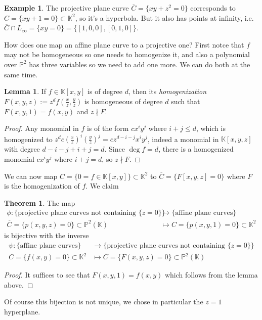 \documentclass{article}
\newcommand{\K}{\mathbb{K}}
\newcommand{\p}{\mathbb{P}}
\theoremstyle{definition}
\newtheorem{thm}[defn]{Theorem}
\newtheorem{lemma}[defn]{Lemma}
\newtheorem{example}[defn]{Example}
\begin{document}
\begin{example}
The projective plane curve $\overline C=\{xy+z^2=0\}$ corresponds to $C=\{xy+1=0\}\subset\K^2$, so it's a hyperbola. But it also has points at infinity, i.e. $\overline C\cap L_\infty=\{xy=0\}=\{[1,0,0],[0,1,0]\}$.
\end{example}

How does one map an affine plane curve to a projective one? First notce that $f$ may not be homogeneous so one needs to homogenize it, and also a polynomial over $\p^2$ has three variables so we need to add one more. We can do both at the same time.

\begin{lemma}
If $f\in\K[x,y]$ is of degree $d$, then its \textit{homogenization} $F(x,y,z):=z^d f\left(\frac{x}{z},\frac{y}{z}\right)$ is homogeneous of degree $d$ such that $F(x,y,1)=f(x,y)$ and $z\nmid F$.
\end{lemma}
\begin{proof}
Any monomial in $f$ is of the form $cx^iy^j$ where $i+j\leq d$, which is homogenized to $z^d c\left(\frac{x}{z}\right)^i\left(\frac{y}{z}\right)^j=cz^{d-i-j}x^iy^j$, indeed a monomial in $\K[x,y,z]$ with degree $d-i-j+i+j=d$. Since $\deg f=d$, there is a homogenized monomial $cx^iy^j$ where $i+j=d$, so $z\nmid F$.
\end{proof}

We can now map $C=\{0=f\in\K[x,y]\}\subset\K^2$ to $\overline C=\{F[x,y,z]=0\}$ where $F$ is the homogenization of $f$. We claim
\begin{thm}
The map
\[
\begin{aligned}
\phi:\{\text{projective plane curves not containing }\{z=0\}\}&\rightarrow\{\text{affine plane curves}\} \\
\overline C=\{p(x,y,z)=0\}\subset\p^2(\K)&\mapsto C=\{p(x,y,1)=0\}\subset\K^2
\end{aligned}
\]
is bijective with the inverse
\[
\begin{aligned}
\psi:\{\text{affine plane curves}\}&\rightarrow\{\text{projective plane curves not containing }\{z=0\}\} \\
C=\{f(x,y)=0\}\subset\K^2&\mapsto\overline C=\{F(x,y,z)=0\}\subset\p^2(\K)
\end{aligned}
\]
\end{thm}
\begin{proof}
It suffices to see that $F(x,y,1)=f(x,y)$ which follows from the lemma above.
\end{proof}
Of course this bijection is not unique, we chose in particular the $z=1$ hyperplane.
\end{document}
